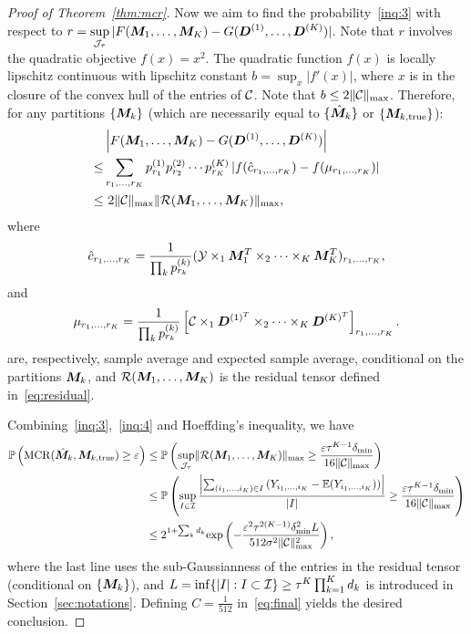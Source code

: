 \documentclass{article}
\DeclareMathOperator*{\mcr}{MCR}
\begin{document}
\begin{appendices}
\begin{proof}[Proof of Theorem~\ref{thm:mcr}]
Now we aim to find the probability~\eqref{inq:3} with respect to $r=\displaystyle\sup_{\mathcal{J}_\tau} |F(\bm M_1,\ldots,\bm M_K)-G(\bm{D}^{(1)},\ldots,\bm{D}^{(K)})|$. Note that $r$ involves the quadratic objective $f(x)=x^2$. The quadratic function $f(x)$ is locally lipschitz continuous with lipschitz constant $b = \sup_x|f'(x)|$, where $x$ is in the closure of the convex hull of the entries of $\mathcal{C}$. Note that $b\leq 2\lVert\mathcal{C}\rVert_{\max}$. Therefore, for any partitions $\{\bm M_k\}$ (which are necessarily equal to $\{\hat {\bm M}_k\}$ or $\{\bm M_{k,\text{true}}\}$):
\begin{align}\label{inq:4}
&\left|F(\bm M_1,\ldots,\bm M_K)-G(\bm{D}^{(1)}, \ldots,\bm{D}^{(K)})\right|\notag \\
\leq&\sum_{r_1,\ldots,r_K}p_{r_1}^{(1)}p_{r_2}^{(2)}\cdots p_{r_K}^{(K)}\left|f(\hat c_{r_1,\ldots,r_K})-f(\mu_{r_1,\ldots,r_K})\right|\notag \\
\leq& \ 2\lVert\mathcal{C}\rVert_{\max}\lVert\mathcal{R}(\bm M_1,\ldots,\bm M_K)\rVert_{\max},
\end{align}
where 
\[
\hat c_{r_1,\ldots,r_K}={1\over \prod_k p^{(k)}_{r_k}}  (\mathcal{Y}\times_1 \bm M^T_1\times_2\cdots\times_K\bm M^T_K)_{r_1,\ldots,r_K},
\]
and
\[
\mu_{r_1,\ldots,r_K}={1\over \prod_k  p^{(k)}_{r_k}}\left[ \mathcal{C}\times_1 \bm{D}^{(1)^T} \times_2\cdots\times_K \bm{D}^{(K)^T}\right]_{r_1,\ldots,r_K}.
\]
are, respectively, sample average and expected sample average, conditional on the partitions ${\bm M_k}$, and $\mathcal{R}( \bm M_1,\ldots,\bm M_K)$ is the residual tensor defined in~\eqref{eq:residual}. 

Combining~\eqref{inq:3},~\eqref{inq:4} and Hoeffding's inequality, we have
\begin{align}\label{eq:final}
\mathbb{P}\left(\mcr(\hat{\mM}_k, \mM_{k,\text{true}}) \geq \varepsilon\right)
&\leq \mathbb{P}\left(\sup_{\tJ_\tau}\mnormSize{}{\tR(\mM_1,\ldots,\mM_K)} \geq {\varepsilon \tau^{K-1}\delta_{\min} \over 16 \mnormSize{}{\tC}}\right)\notag\notag \\
&\leq \mathbb{P}\left(  \sup_{I\in\tI} {\left|\sum_{(i_1,\ldots,i_K)\in I}\left(Y_{i_1,\ldots,i_K}-\mathbb{E}(Y_{i_1,\ldots,i_K})\right)\right|\over |I|}\geq   {\varepsilon \tau^{K-1}\delta_{\min} \over 16 \mnormSize{}{\tC}} \right)\notag \\
&\leq 2^{1+\sum_k d_k}\text{exp}\left( -\frac{\varepsilon^2\tau^{2(K-1)}\delta_{\min}^2L}{512\sigma^2 \mnormSize{}{\tC}^2} \right),
\end{align}
where the last line uses the sub-Gaussianness of the entries in the residual tensor (conditional on $\{\bm M_k\}$), and $L=\inf\{|I|: I\subset \mathcal{I}\} \geq \tau^K\prod_{k=1}^Kd_k$ is introduced in Section~\ref{sec:notations}.
Defining $C=\frac{1}{512}$ in~\eqref{eq:final} yields the desired conclusion.



\end{proof}
\end{appendices}
\end{document}

